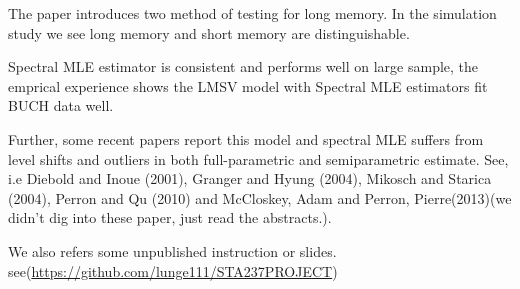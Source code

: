 \documentclass[10pt,a4paper]{article}
\begin{document}
The paper introduces two method of testing for long memory. In the simulation study we see long memory and short memory are distinguishable. 

Spectral MLE estimator is consistent and performs well on large sample, the emprical experience shows the LMSV model with Spectral MLE estimators fit BUCH data well.

Further, some recent papers report this model and spectral MLE suffers from level shifts and outliers in both full-parametric and semiparametric estimate. See, i.e Diebold and Inoue (2001)\cite{diebold2001long}, Granger and Hyung (2004)\cite{granger2004occasional},
Mikosch and Starica (2004)\cite{mikosch2004nonstationarities}, Perron and Qu (2010)\cite{shumway2000time} and McCloskey, Adam and Perron, Pierre(2013)\cite{mccloskey2013memory}(we didn't dig into these paper, just read the abstracts.).

\renewcommand\refname{Reference}

 
We also refers some unpublished instruction or slides. see(\url{https://github.com/lunge111/STA237PROJECT})
\end{document}
